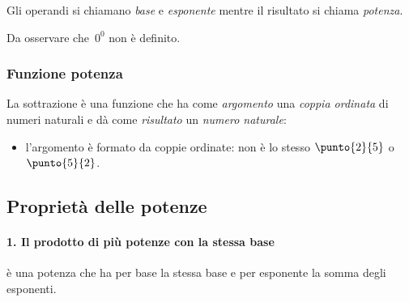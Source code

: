Gli operandi si chiamano \emph{base} e \emph{esponente} mentre il 
risultato si chiama \emph{potenza}.

Da osservare che~\(0^0\) non è definito.

\subsubsection{Funzione potenza}

La sottrazione è una funzione che ha come \emph{argomento} una \emph{coppia 
ordinata} di numeri naturali e dà come \emph{risultato} un \emph{numero 
naturale}:

\vspace{1em}
\begin{minipage}[t]{.48\textwidth}
\begin{center}
\begin{inaccessibleblock}
\end{inaccessibleblock}
\end{center}
\end{minipage}
\hfill
\begin{minipage}[t]{.48\textwidth}
\begin{center}
\begin{inaccessibleblock}
\end{inaccessibleblock}
\end{center}
\end{minipage}

\vspace{-1em}
\begin{osservazione}
\begin{itemize} [nosep]
\item l'argomento è formato da coppie ordinate: non è lo stesso 
\(\punto{2}{5}\) o \(\punto{5}{2}\).
\end{itemize}

\end{osservazione}

\subsection{Proprietà delle potenze}

\paragraph{1. Il prodotto di più potenze con la stessa base} 
è una potenza che ha per base la stessa base e per esponente la somma degli 
esponenti.

